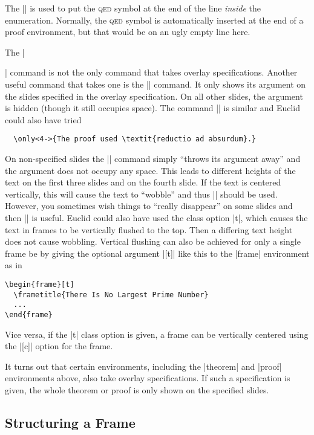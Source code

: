 The |\qedhere| is used to put the \textsc{qed} symbol at the end of the line \emph{inside} the enumeration. Normally, the \textsc{qed} symbol is automatically inserted at the end of a proof environment, but that would be on an ugly empty line here.

The |\item| command is not the only command that takes overlay specifications. Another useful command that takes one is the |\uncover| command. It only shows its argument on the slides specified in the overlay specification. On all other slides, the argument is hidden (though it still occupies space). The command |\only| is similar and Euclid could also have tried
\begin{verbatim}
  \only<4->{The proof used \textit{reductio ad absurdum}.}
\end{verbatim}

On non-specified slides the |\only| command simply ``throws its argument away'' and the argument does not occupy any space. This leads to different heights of the text on the first three slides and on the fourth slide. If the text is centered vertically, this will cause the text to ``wobble'' and thus |\uncover| should be used. However, you sometimes wish things to ``really disappear'' on some slides and then |\only| is useful. Euclid could also have used the class option |t|, which causes the text in frames to be vertically flushed to the top. Then a differing text height does not cause wobbling. Vertical flushing can also be achieved for only a single frame be by giving the optional argument |[t]| like this to the |frame| environment as in
\begin{verbatim}
\begin{frame}[t]
  \frametitle{There Is No Largest Prime Number}
  ...
\end{frame}
\end{verbatim}
Vice versa, if the |t| class option is given, a frame can be vertically centered using the |[c]| option for the frame.

It turns out that certain environments, including the |theorem| and |proof| environments above, also take overlay specifications. If such a specification is given, the whole theorem or proof is only shown on the specified slides.


\subsection{Structuring a Frame}

